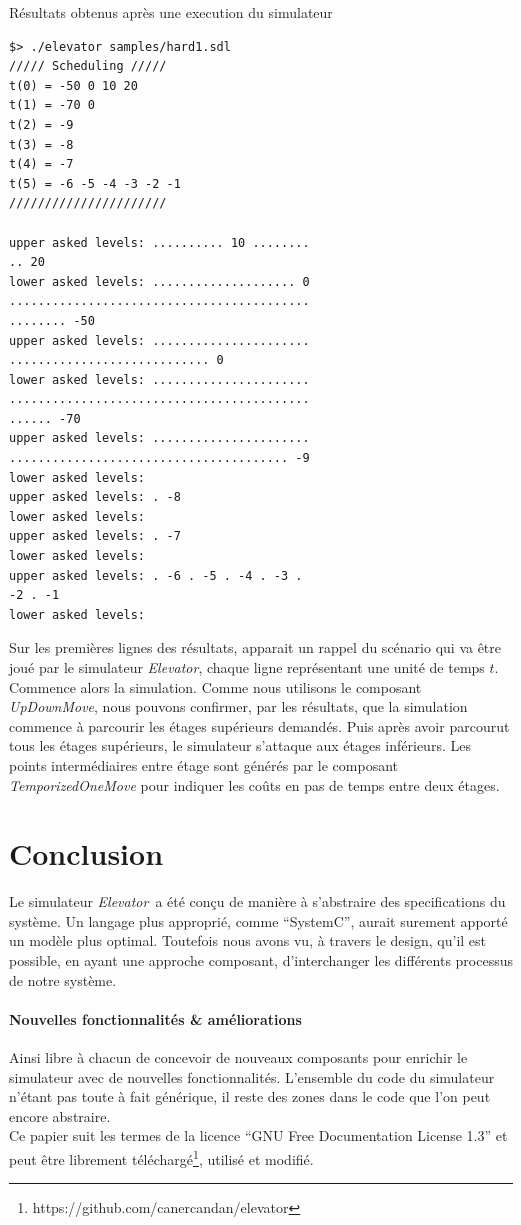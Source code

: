 \documentclass[twocolumn,oneside,10pt]{article}
\newcommand {\elevator}   {{\em Elevator}}
\begin{document}
\begin{algorithm}[h]
  \caption{Résultats obtenus après une execution du simulateur}
  \label{exemple_execution}
\begin{verbatim}
$> ./elevator samples/hard1.sdl
///// Scheduling /////
t(0) = -50 0 10 20
t(1) = -70 0
t(2) = -9
t(3) = -8
t(4) = -7
t(5) = -6 -5 -4 -3 -2 -1
//////////////////////

upper asked levels: .......... 10 ........
.. 20
lower asked levels: .................... 0
..........................................
........ -50
upper asked levels: ......................
............................ 0
lower asked levels: ......................
..........................................
...... -70
upper asked levels: ......................
....................................... -9
lower asked levels:
upper asked levels: . -8
lower asked levels:
upper asked levels: . -7
lower asked levels:
upper asked levels: . -6 . -5 . -4 . -3 .
-2 . -1
lower asked levels:
\end{verbatim}
\end{algorithm}

Sur les premières lignes des résultats, apparait un rappel du scénario qui va être joué par le simulateur \elevator, chaque ligne représentant une unité de temps $t$. Commence alors la simulation. Comme nous utilisons le composant {\em UpDownMove}, nous pouvons confirmer, par les résultats, que la simulation commence à parcourir les étages supérieurs demandés. Puis après avoir parcourut tous les étages supérieurs, le simulateur s'attaque aux étages inférieurs. Les points intermédiaires entre étage sont générés par le composant {\em TemporizedOneMove} pour indiquer les coûts en pas de temps entre deux étages.

\section{Conclusion}

Le simulateur \elevator\ a été conçu de manière à s'abstraire des specifications du système. Un langage plus approprié, comme ``SystemC'', aurait surement apporté un modèle plus optimal. Toutefois nous avons vu, à travers le design, qu'il est possible, en ayant une approche composant, d'interchanger les différents processus de notre système.

\paragraph{Nouvelles fonctionnalités \& améliorations}

Ainsi libre à chacun de concevoir de nouveaux composants pour enrichir le simulateur avec de nouvelles fonctionnalités. L'ensemble du code du simulateur n'étant pas toute à fait générique, il reste des zones dans le code que l'on peut encore abstraire.\\

Ce papier suit les termes de la licence ``GNU Free Documentation License 1.3'' et peut être librement téléchargé\footnote{https://github.com/canercandan/elevator}, utilisé et modifié.
\end{document}
